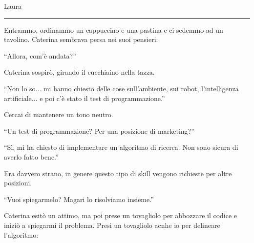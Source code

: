 \vspace{1em}
\begin{center}Laura\end{center}
\hrule
\vspace{1em}
Entrammo, ordinammo un cappuccino e una pastina e ci sedemmo ad un tavolino. Caterina  sembrava persa nei suoi pensieri.

\begin{dialogue}
 \enquote{Allora, com'è andata?}
\end{dialogue}

Caterina sospirò, girando il cucchiaino nella tazza.

\begin{dialogue}
 \enquote{Non lo so... mi hanno chiesto delle cose sull'ambiente, sui robot, l'intelligenza artificiale... e poi c'è stato il test di programmazione.}
\end{dialogue}

Cercai di mantenere un tono neutro.

\begin{dialogue}
 \enquote{Un test di programmazione? Per una posizione di marketing?}
\end{dialogue}

\begin{dialogue}
 \enquote{Sì, mi ha chiesto di implementare un algoritmo di ricerca. Non sono sicura di averlo fatto bene.}
\end{dialogue}

Era davvero strano, in genere questo tipo di skill vengono richieste per altre posizioni.

\begin{dialogue}
 \enquote{Vuoi spiegarmelo? Magari lo risolviamo insieme.}
\end{dialogue}

Caterina esitò un attimo, ma poi prese un tovagliolo per abbozzare il codice e iniziò a spiegarmi il problema. Presi un tovagliolo acnhe io per delineare l'algoritmo:

